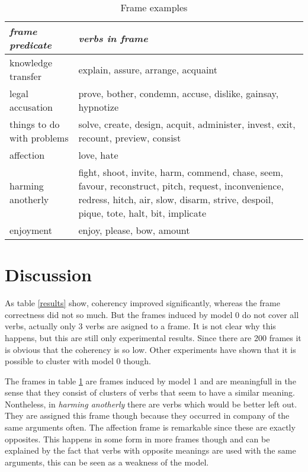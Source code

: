 \documentclass{article} %
\begin{document}
\begin{table}
\begin{tabular}{|p{}|p{}|}
  \hline
  \textit{frame predicate} & \textit{verbs in frame}\\
  \hline
  \hline
  knowledge transfer & explain, assure, arrange, acquaint\\
  \hline
  legal accusation & prove, bother, condemn, accuse, dislike, gainsay, hypnotize\\
  \hline
  things to do with problems & solve, create, design, acquit, administer, invest, exit, recount, preview, consist\\
  \hline
  affection & love, hate\\
  \hline
  harming anotherly &fight, shoot, invite, harm, commend, chase, seem, favour, reconstruct, pitch, request, inconvenience, redress, hitch, air, slow, disarm, strive, despoil, pique, tote, halt, bit, implicate\\
  \hline
  enjoyment & enjoy, please, bow, amount\\
  \hline
\end{tabular}
\label{exframes}
\caption{Frame examples}
\end{table}

\section{Discussion}
As table \ref{results} show, coherency  improved significantly, whereas the frame correctness did not so much. But the frames induced by model 0 do not cover all verbs, actually only 3 verbs are asigned to a frame. It is not clear why this happens, but this are still only experimental results.  Since there are 200 frames it is obvious that the coherency is so low. Other experiments have shown that it is possible to cluster with model 0 though. 

The frames in table \ref{exframes} are frames induced by model 1 and are meaningfull in the sense that they consist of clusters of verbs that seem to have a similar meaning. Nontheless, in \textit{harming anotherly} there are verbs which would be better left out. They are assigned this frame though because they occurred in company of the same arguments often. The affection frame is remarkable since these are exactly opposites. This happens in some form in more frames though and can be explained by the fact that verbs with opposite meanings are used with the same arguments, this can be seen as a weakness of the model.
\end{document}
